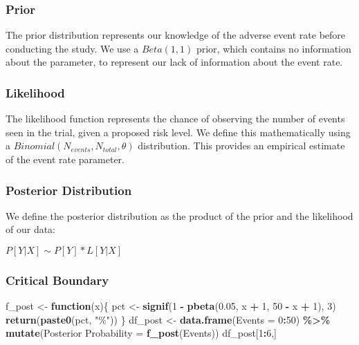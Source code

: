 \documentclass[
]{article}
\newenvironment{Shaded}{\begin{snugshade}}{\end{snugshade}}
\newcommand{\AttributeTok}[1]{\textcolor[rgb]{0.13,0.29,0.53}{#1}}
\newcommand{\ControlFlowTok}[1]{\textcolor[rgb]{0.13,0.29,0.53}{\textbf{#1}}}
\newcommand{\DecValTok}[1]{\textcolor[rgb]{0.00,0.00,0.81}{#1}}
\newcommand{\FloatTok}[1]{\textcolor[rgb]{0.00,0.00,0.81}{#1}}
\newcommand{\FunctionTok}[1]{\textcolor[rgb]{0.13,0.29,0.53}{\textbf{#1}}}
\newcommand{\NormalTok}[1]{#1}
\newcommand{\OtherTok}[1]{\textcolor[rgb]{0.56,0.35,0.01}{#1}}
\newcommand{\SpecialCharTok}[1]{\textcolor[rgb]{0.81,0.36,0.00}{\textbf{#1}}}
\newcommand{\StringTok}[1]{\textcolor[rgb]{0.31,0.60,0.02}{#1}}
\begin{document}
\hypertarget{prior}{%
\subsubsection{Prior}\label{prior}}

The prior distribution represents our knowledge of the adverse event
rate before conducting the study. We use a \(Beta(1,1)\) prior, which
contains no information about the parameter, to represent our lack of
information about the event rate.

\hypertarget{likelihood}{%
\subsubsection{Likelihood}\label{likelihood}}

The likelihood function represents the chance of observing the number of
events seen in the trial, given a proposed risk level. We define this
mathematically using a \(Binomial(N_{events}, N_{total}, \theta)\)
distribution. This provides an empirical estimate of the event rate
parameter.

\hypertarget{posterior-distribution}{%
\subsubsection{Posterior Distribution}\label{posterior-distribution}}

We define the posterior distribution as the product of the prior and the
likelihood of our data:

\(P[Y|X] \sim P[Y] * L[Y | X]\)

\hypertarget{critical-boundary}{%
\subsubsection{Critical Boundary}\label{critical-boundary}}

\begin{Shaded}
\begin{Highlighting}[]
\NormalTok{f\_post }\OtherTok{\textless{}{-}} \ControlFlowTok{function}\NormalTok{(x)\{}
\NormalTok{  pct }\OtherTok{\textless{}{-}} \FunctionTok{signif}\NormalTok{(}\DecValTok{1} \SpecialCharTok{{-}} \FunctionTok{pbeta}\NormalTok{(}\FloatTok{0.05}\NormalTok{, x }\SpecialCharTok{+} \DecValTok{1}\NormalTok{, }\DecValTok{50} \SpecialCharTok{{-}}\NormalTok{ x }\SpecialCharTok{+} \DecValTok{1}\NormalTok{), }\DecValTok{3}\NormalTok{)}
  \FunctionTok{return}\NormalTok{(}\FunctionTok{paste0}\NormalTok{(pct, }\StringTok{"\%"}\NormalTok{))}
\NormalTok{\}}
\NormalTok{df\_post }\OtherTok{\textless{}{-}} \FunctionTok{data.frame}\NormalTok{(}\AttributeTok{Events =} \DecValTok{0}\SpecialCharTok{:}\DecValTok{50}\NormalTok{) }\SpecialCharTok{\%\textgreater{}\%}
  \FunctionTok{mutate}\NormalTok{(}\StringTok{\textasciigrave{}}\AttributeTok{Posterior Probability}\StringTok{\textasciigrave{}} \OtherTok{=} \FunctionTok{f\_post}\NormalTok{(Events))}
\NormalTok{df\_post[}\DecValTok{1}\SpecialCharTok{:}\DecValTok{6}\NormalTok{,]}
\end{Highlighting}
\end{Shaded}
\end{document}

